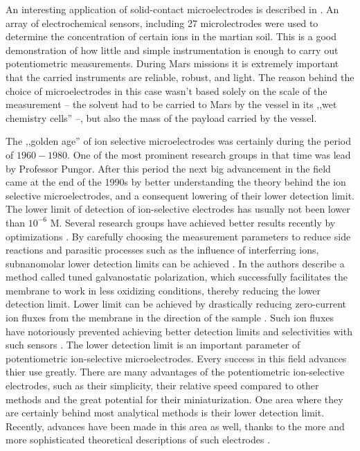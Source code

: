 An interesting application of solid-contact microelectrodes is described in \cite{kounaves2002determination}.
An array of electrochemical sensors, including 27 microlectrodes were used to determine the concentration of certain ions in the martian soil.
This is a good demonstration of how little and simple instrumentation is enough to carry out potentiometric measurements.
During Mars missions it is extremely important that the carried instruments are reliable, robust, and light.
The reason behind the choice of microelectrodes in this case wasn't based solely on the scale of the measurement -- the solvent had to be carried to Mars by the vessel in its ,,wet chemistry cells'' --, but also the mass of the payload carried by the vessel.

The ,,golden age'' of ion selective microelectrodes was certainly during the period of $1960-1980$.
One of the most prominent research groups in that time was lead by Professor Pungor.
After this period the next big advancement in the field came at the end of the 1990s by better understanding the theory behind the ion selective microelectrodes, and a consequent lowering of their lower detection limit.
The lower limit of detection of ion-selective electrodes has usually not been lower than $10^{-6}$ M.
Several research groups have achieved better results recently by optimizations \cite{sodergaard2003lowering}.
By carefully choosing the measurement parameters to reduce side reactions and parasitic processes such as the influence of interferring ions, subnanomolar lower detection limits can be achieved \cite{lisak2010study}.
In \cite{lisak2011tuned} the authors describe a method called tuned galvanostatic polarization, which successfully facilitates the membrane to work in less oxidizing conditions, thereby reducing the lower detection limit.
Lower limit can be achieved by drastically reducing zero-current ion fluxes from the membrane in the direction of the sample \cite{malon2006potentiometry}.
Such ion fluxes have notoriously prevented achieving better detection limits and selectivities with such sensors \cite{sutter2004solid}.
The lower detection limit is an important parameter of potentiometric ion-selective microelectrodes.
Every success in this field advances thier use greatly.
There are many advantages of the potentiometric ion-selective electrodes, such as their simplicity, their relative speed compared to other methods and the great potential for their miniaturization.
One area where they are certainly behind most analytical methods is their lower detection limit.
Recently, advances have been made in this area as well, thanks to the more and more sophisticated theoretical descriptions of such electrodes \cite{jasielec2010comparison}.


